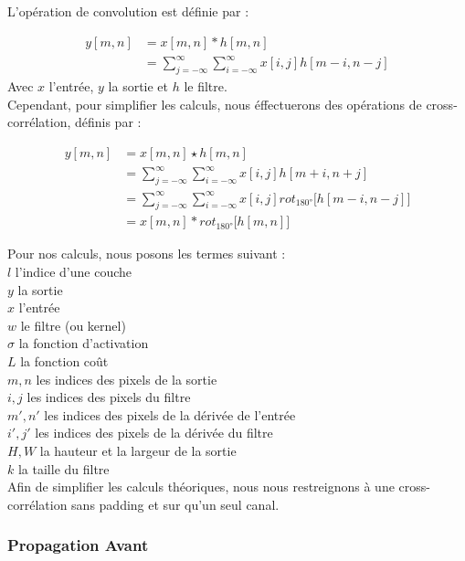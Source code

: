 \begin{multicols}{2}
L'opération de convolution est définie par : 

\begin{align}
y[m,n] &= x[m,n] * h[m,n]\\
&=\sum^{\infty }_{j=-\infty}\sum^{\infty }_{i=-\infty}x[i,j]h[m-i,n-j]
\end{align}
Avec $x$ l'entrée, $y$ la sortie et $h$ le filtre.\\

Cependant, pour simplifier les calculs, nous éffectuerons des opérations de cross-corrélation, définis par : 

\begin{align}
    y[m,n] &= x[m,n] \star h[m,n]\\
    &=\sum^{\infty }_{j=-\infty}\sum^{\infty }_{i=-\infty}x[i,j]h[m+i,n+j]\\
    &= \sum^{\infty }_{j=-\infty}\sum^{\infty }_{i=-\infty}x[i,j] rot_{\ang{180}}\big[h[m-i,n-j]\big] \\
    &= x[m,n] * rot_{\ang{180}} \big[h[m,n]\big] 
\end{align}

Pour nos calculs, nous posons les termes suivant : \\

$l$ l'indice d'une couche\\
$y$ la sortie\\
$x$ l'entrée\\
$w$ le filtre (ou kernel) \\
$\sigma$ la fonction d'activation\\
$L$ la fonction coût\\
$m,n$ les indices des pixels de la sortie\\
$i,j$ les indices des pixels du filtre\\
$m',n'$ les indices des pixels de la dérivée de l'entrée\\
$i',j'$ les indices des pixels de la dérivée du filtre\\
$H,W$ la hauteur et la largeur de la sortie\\
$k$ la taille du filtre \\

Afin de simplifier les calculs théoriques, nous nous restreignons à une 
cross-corrélation sans padding et sur qu'un seul canal. \\

\subsubsection{Propagation Avant}


\end{multicols}
